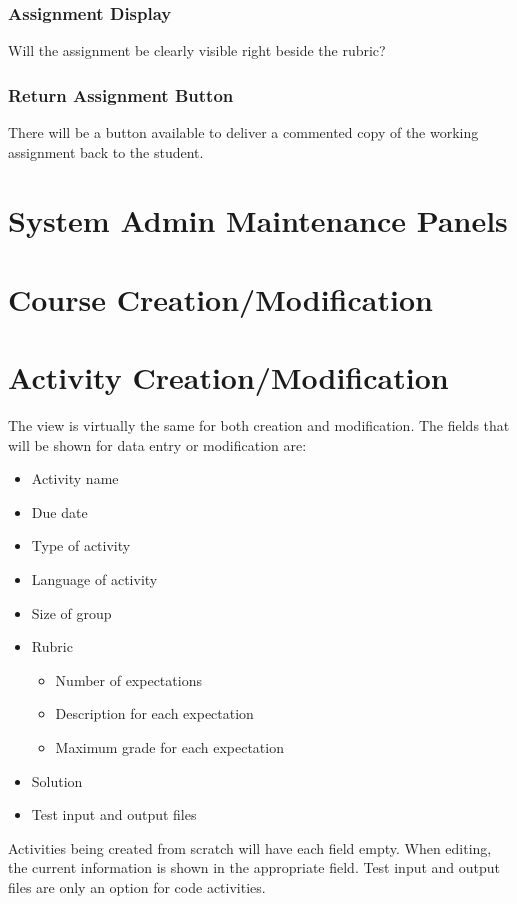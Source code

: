 \documentclass{article}
\begin{document}
\subsubsection{Assignment Display}
Will the assignment be clearly visible right beside the rubric?
\subsubsection{Return Assignment Button}
There will be a button available to deliver a commented copy of the working
assignment back to the student.

\section{System Admin Maintenance Panels}

\section{Course Creation/Modification}

\section{Activity Creation/Modification}
The view is virtually the same for both creation and modification.
The fields that will be shown for data entry or modification are:
\begin{itemize}
	\item Activity name
	\item Due date
	\item Type of activity
	\item Language of activity
	\item Size of group
	\item Rubric
	\begin{itemize}
		\item Number of expectations
		\item Description for each expectation
		\item Maximum grade for each expectation
	\end{itemize}
	\item Solution
	\item Test input and output files
\end{itemize}

Activities being created from scratch will have each field empty.
When editing, the current information is shown in the appropriate field.
Test input and output files are only an option for code activities.
\end{document}
